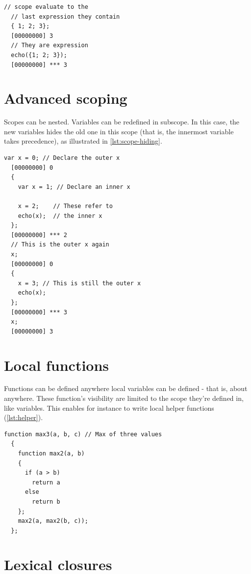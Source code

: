 \documentclass[openright,twoside,12pt]{report}
\newcommand{\lst}[1]{\autoref{lst:#1}}
\begin{document}
\begin{lstlisting}[caption=Using scope as expressions,label=lst:scope-exp]
  // scope evaluate to the
  // last expression they contain
  { 1; 2; 3};
  [00000000] 3
  // They are expression
  echo({1; 2; 3});
  [00000000] *** 3
\end{lstlisting}

\section{Advanced scoping}

Scopes can be nested. Variables can be redefined in subscope. In this
case, the new variables hides the old one in this scope (that is, the
innermost variable takes precedence), as illustrated in
\lst{scope-hiding}.

\begin{lstlisting}[caption=Redefining variables in
  subscopes,label=lst:scope-hiding]
  var x = 0; // Declare the outer x
  [00000000] 0
  {
    var x = 1; // Declare an inner x

    x = 2;    // These refer to
    echo(x);  // the inner x
  };
  [00000000] *** 2
  // This is the outer x again
  x;
  [00000000] 0
  {
    x = 3; // This is still the outer x
    echo(x);
  };
  [00000000] *** 3
  x;
  [00000000] 3

\end{lstlisting}

\section{Local functions}

Functions can be defined anywhere local variables can be defined -
that is, about anywhere. These function's visibility are limited to
the scope they're defined in, like variables. This enables for
instance to write local helper functions (\lst{helper}).

\begin{lstlisting}[caption=Local helper function, label=lst:helper]
  function max3(a, b, c) // Max of three values
  {
    function max2(a, b)
    {
      if (a > b)
        return a
      else
        return b
    };
    max2(a, max2(b, c));
  };
\end{lstlisting}

\section{Lexical closures}
\end{document}
